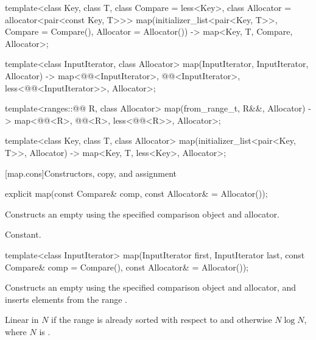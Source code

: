\begin{codeblock}
{  template<class Key, class T, class Compare = less<Key>,
           class Allocator = allocator<pair<const Key, T>>>
    map(initializer_list<pair<Key, T>>, Compare = Compare(), Allocator = Allocator())
      -> map<Key, T, Compare, Allocator>;

  template<class InputIterator, class Allocator>
    map(InputIterator, InputIterator, Allocator)
      -> map<@@<InputIterator>, @@<InputIterator>,
             less<@@<InputIterator>>, Allocator>;

  template<ranges::@@ R, class Allocator>
    map(from_range_t, R&&, Allocator)
      -> map<@@<R>, @@<R>, less<@@<R>>, Allocator>;

  template<class Key, class T, class Allocator>
    map(initializer_list<pair<Key, T>>, Allocator) -> map<Key, T, less<Key>, Allocator>;
}
\end{codeblock}


[map.cons]{Constructors, copy, and assignment}%
%

%
\begin{itemdecl}
explicit map(const Compare& comp, const Allocator& = Allocator());
\end{itemdecl}

\begin{itemdescr}
\pnum
\effects
Constructs an empty
using the specified comparison object and allocator.

\pnum
\complexity
Constant.
\end{itemdescr}

%
\begin{itemdecl}
template<class InputIterator>
  map(InputIterator first, InputIterator last,
      const Compare& comp = Compare(), const Allocator& = Allocator());
\end{itemdecl}

\begin{itemdescr}
\pnum
\effects
Constructs an empty
using the specified comparison object and allocator,
and inserts elements from the range
.

\pnum
\complexity
Linear in $N$ if the range
is already sorted with respect to 
and otherwise $N \log N$, where $N$
is .
\end{itemdescr}

